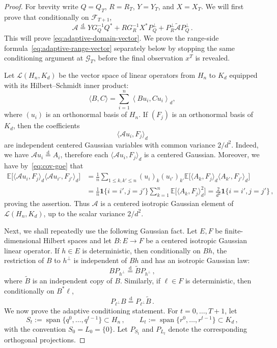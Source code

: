 \documentclass[11pt]{article}
\theoremstyle{definition}
\theoremstyle{remark}
\numberwithin{equation}{section}
\numberwithin{theorem}{section}
\newcommand{\E}{\mathbb E}
\newcommand{\ip}[2]{\left\langle #1,#2\right\rangle}
\newcommand{\cA}{\mathcal A}
\newcommand{\one}{\mathbf{1}}
\begin{document}
\begin{proof}
For brevity write $Q=Q_T$, $R=R_T$, $Y=Y_T$, and $X=X_T$. We will first prove that conditionally on $\mathscr F_{T+1}$,
\begin{equation}\label{eq:adaptive-conditioning}
  \mathcal A
  \stackrel{\mathrm d}{=}
  Y G_Q^{-1}Q^* + R G_R^{-1}X^*P_Q^\perp + P_R^\perp\widetilde{\mathcal A}P_Q^\perp\,.
\end{equation}
This will prove \eqref{eq:adaptive-domain-vector}.  We prove the range-side formula~\eqref{eq:adaptive-range-vector} separately below by stopping the same conditioning argument at $\mathscr G_T$, before the final observation $x^T$ is revealed.

Let $\mathscr L(H_n,K_d)$ be the vector space of linear operators from $H_n$ to $K_d$ equipped with its Hilbert--Schmidt inner product: 
\[\langle B, C\rangle = \sum_{i=1}^n \ip{Bu_i}{Cu_i}_{d},\]
where $(u_i)$ is an orthonormal basis of $H_n$.
If $(F_j)$ is an orthonormal basis of $K_d$, then the coefficients
\[
  \langle \mathcal A u_i,F_j\rangle_d
\]
are independent centered Gaussian variables with common variance $2/d^2$. Indeed, we have $\mathcal A u_i \stackrel{\mathrm d}{=} A_i$, therefore each $\langle \cA u_i,F_j\rangle_d$ is a centered Gaussian. Moreover, we have by~\eqref{eq:cov-goe} that
\begin{align*}
\E\big[ \langle \cA u_i, F_j \rangle_d \langle \cA u_{i'}, F_{j'} \rangle_d \big] &= \frac1n \sum_{1 \le k, k' \le n} (u_i)_k (u_{i'})_{k'} \E\big[ \langle A_k, F_j \rangle_d \langle A_{k'}, F_{j'} \rangle_d \big] \\
&= \frac1n \one\{i=i', j=j' \} \sum_{k=1}^n \E\big[ \langle A_k, F_j \rangle_d^2 \big] = \frac2{d^2} \one\{i=i', j=j' \}\,,
\end{align*}
proving the assertion. Thus $\cA$ is a centered isotropic Gaussian element of $\mathscr L(H_n,K_d)$, up to the scalar variance $2/d^2$.

Next, we shall repeatedly use the following Gaussian fact. Let $E,F$ be finite-dimensional Hilbert spaces and let $B:E\to F$ be a centered isotropic Gaussian linear operator. If $h\in E$ is deterministic, then conditionally on $Bh$, the restriction of $B$ to $h^\perp$ is independent of $Bh$ and has an isotropic Gaussian law:
\begin{equation}\label{eq:one-step-domain}
  BP_{h^\perp}
  \stackrel{\mathrm d}{=}
  \widetilde B P_{h^\perp}\,,
\end{equation}
where $\widetilde B$ is an independent copy of $B$. Similarly, if $\ell\in F$ is deterministic, then conditionally on $B^*\ell$, 
\begin{equation}\label{eq:one-step-range}
  P_{\ell^\perp}B
  \stackrel{\mathrm d}{=}
  P_{\ell^\perp}\widetilde B\,.
\end{equation}
%
We now prove the adaptive conditioning statement. For $t=0,\ldots,T+1$, let
\[
  S_t:=\operatorname{span}\{q^0,\ldots,q^{t-1}\}\subset H_n\,,
  \qquad
  L_t:=\operatorname{span}\{r^0,\ldots,r^{t-1}\}\subset K_d\,,
\]
with the convention $S_0=L_0=\{0\}$. Let $P_{S_t}$ and $P_{L_t}$ denote the corresponding orthogonal projections.


\end{proof}
\end{document}
